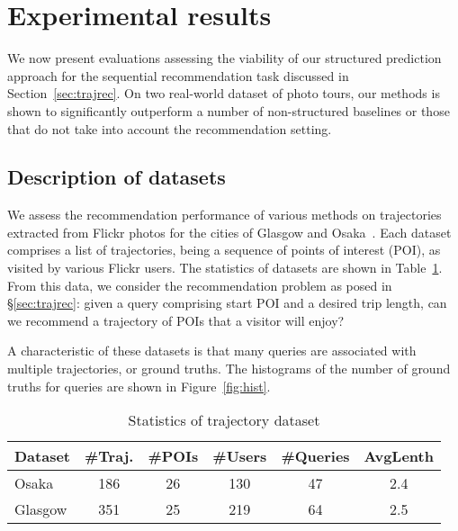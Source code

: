
\section{Experimental results}
\label{sec:experiment}

We now present evaluations assessing the viability of our structured prediction approach
for the sequential recommendation task discussed in Section~\ref{sec:trajrec}. 
On two real-world dataset of photo tours, our methods is shown to significantly outperform 
a number of non-structured baselines or those that do not take into account the recommendation setting. 


%
\subsection{Description of datasets}
\label{sec:dataset}

We assess the recommendation performance %
of various methods
on trajectories extracted from Flickr photos
for the cities of Glasgow and Osaka~\cite{thomee2016yfcc100m,ijcai15}.
Each dataset comprises a
list of trajectories, being a sequence of points of interest (POI), as visited by various Flickr users.
The statistics of datasets are shown in Table~\ref{tab:data}.
From this data, we consider the recommendation problem as posed in \S\ref{sec:trajrec}:
given a query comprising start POI and a desired trip length, can we recommend a trajectory of POIs that a visitor will enjoy?

A characteristic of these datasets is that many queries are associated with multiple trajectories, or ground truths.
The histograms of the number of ground truths for queries are shown in Figure~\ref{fig:hist}.

\begin{table}[t]
\caption{Statistics of trajectory dataset}
\label{tab:data}
\centering
\setlength{\tabcolsep}{4pt} %
\small
\begin{tabular}{l*{5}{c}} \hline
\textbf{Dataset} & \textbf{\#Traj.} & \textbf{\#POIs} & \textbf{\#Users} & \textbf{\#Queries} & \textbf{AvgLenth} \\ \hline
Osaka            & 186              & 26              & 130              & 47                 & 2.4 \\
Glasgow          & 351              & 25              & 219              & 64                 & 2.5 \\
\hline
\end{tabular}
\end{table}


